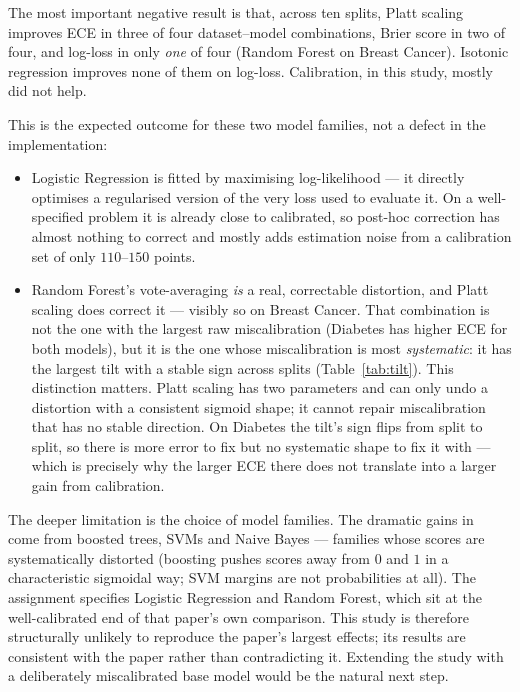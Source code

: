 \documentclass[11pt,a4paper]{article}
\begin{document}
The most important negative result is that, across ten splits, Platt scaling improves ECE in three of four
dataset--model combinations, Brier score in two of four, and log-loss in only \emph{one} of four (Random
Forest on Breast Cancer). Isotonic regression improves none of them on log-loss. Calibration, in this
study, mostly did not help.

This is the expected outcome for these two model families, not a defect in the implementation:

\begin{itemize}
\item Logistic Regression is fitted by maximising log-likelihood --- it directly optimises a regularised
version of the very loss used to evaluate it. On a well-specified problem it is already close to
calibrated, so post-hoc correction has almost nothing to correct and mostly adds estimation noise from a
calibration set of only $110$--$150$ points.
\item Random Forest's vote-averaging \emph{is} a real, correctable distortion, and Platt scaling does
correct it --- visibly so on Breast Cancer. That combination is not the one with the largest raw
miscalibration (Diabetes has higher ECE for both models), but it is the one whose miscalibration is most
\emph{systematic}: it has the largest tilt with a stable sign across splits (Table~\ref{tab:tilt}). This
distinction matters. Platt scaling has two parameters and can only undo a distortion with a consistent
sigmoid shape; it cannot repair miscalibration that has no stable direction. On Diabetes the tilt's sign
flips from split to split, so there is more error to fix but no systematic shape to fix it with --- which
is precisely why the larger ECE there does not translate into a larger gain from calibration.
\end{itemize}

The deeper limitation is the choice of model families. The dramatic gains in~\cite{nm2005} come from
boosted trees, SVMs and Naive Bayes --- families whose scores are systematically distorted (boosting pushes
scores away from $0$ and $1$ in a characteristic sigmoidal way; SVM margins are not probabilities at all).
The assignment specifies Logistic Regression and Random Forest, which sit at the well-calibrated end of
that paper's own comparison. This study is therefore structurally unlikely to reproduce the paper's
largest effects; its results are consistent with the paper rather than contradicting it. Extending the
study with a deliberately miscalibrated base model would be the natural next step.
\end{document}

